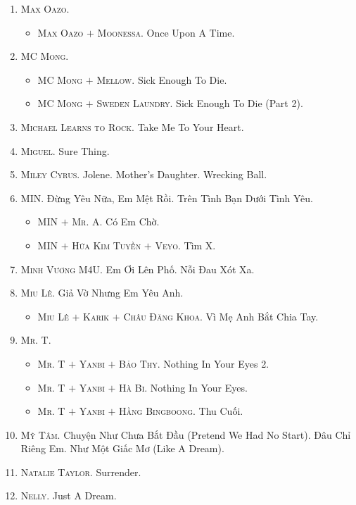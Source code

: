 \documentclass{article}
\begin{document}
\begin{enumerate}
	\item \textsc{Max Oazo.}
	\begin{itemize}
		\item \textsc{Max Oazo $+$ Moonessa.} Once Upon A Time.
	\end{itemize}
	\item \textsc{MC Mong.}
	\begin{itemize}
		\item \textsc{MC Mong $+$ Mellow.} Sick Enough To Die.
		\item \textsc{MC Mong $+$ Sweden Laundry.} Sick Enough To Die (Part 2).
	\end{itemize}
	\item \textsc{Michael Learns to Rock.} Take Me To Your Heart.
	\item \textsc{Miguel.} Sure Thing.
	\item \textsc{Miley Cyrus.} Jolene. Mother's Daughter. Wrecking Ball.
	\item \textsc{MIN.} Đừng Yêu Nữa, Em Mệt Rồi. Trên Tình Bạn Dưới Tình Yêu.
	\begin{itemize}
		\item \textsc{MIN $+$ Mr. A.} Có Em Chờ.
		\item \textsc{MIN $+$ Hứa Kim Tuyền $+$ Veyo.} Tìm X.
	\end{itemize}
	\item \textsc{Minh Vương M4U.} Em Ơi Lên Phố. Nỗi Đau Xót Xa.
	\item \textsc{Miu Lê.} Giả Vờ Nhưng Em Yêu Anh.
	\begin{itemize}
		\item \textsc{Miu Lê $+$ Karik $+$ Châu Đăng Khoa.} Vì Mẹ Anh Bắt Chia Tay.
	\end{itemize}
	\item \textsc{Mr. T.}
	\begin{itemize}
		\item \textsc{Mr. T $+$ Yanbi $+$ Bảo Thy.} Nothing In Your Eyes 2.
		\item \textsc{Mr. T $+$ Yanbi $+$ Hà Bi.} Nothing In Your Eyes.
		\item \textsc{Mr. T $+$ Yanbi $+$ Hằng Bingboong.} Thu Cuối.
	\end{itemize}
	\item \textsc{Mỹ Tâm.} Chuyện Như Chưa Bắt Đầu (Pretend We Had No Start). Đâu Chỉ Riêng Em. Như Một Giấc Mơ (Like A Dream).
	\item \textsc{Natalie Taylor.} Surrender.
	\item \textsc{Nelly.} Just A Dream.

\end{enumerate}
\end{document}
